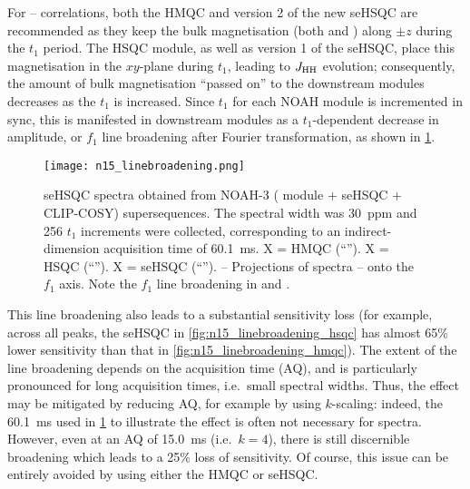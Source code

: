 For \nitrogen{}--\proton{} correlations, both the HMQC and version 2 of the new seHSQC are recommended as they keep the bulk magnetisation (both  and ) along $\pm z$ during the $t_1$ period.
The HSQC module, as well as version 1 of the seHSQC, place this magnetisation in the $xy$-plane during $t_1$, leading to $\jhh$ evolution; consequently, the amount of bulk magnetisation ``passed on'' to the downstream modules decreases as the \nitrogen{} $t_1$ is increased.
Since $t_1$ for each NOAH module is incremented in sync, this is manifested in downstream modules as a $t_1$-dependent decrease in amplitude, or $f_1$ line broadening after Fourier transformation, as shown in \cref{fig:n15_linebroadening}.

\begin{figure}
    \centering
    \texttt{[image: n15\_linebroadening.png]}
    {\label{fig:n15_linebroadening_hmqc}}
    {\label{fig:n15_linebroadening_hsqc}}
    {\label{fig:n15_linebroadening_spv2}}
    {\label{fig:n15_linebroadening_hmqc_f2proj}}
    {\label{fig:n15_linebroadening_hsqc_f2proj}}
    {\label{fig:n15_linebroadening_spv2_f2proj}}
    \caption{
        \carbon{} seHSQC spectra obtained from NOAH-3  (\nitrogen{} module + \carbon{} seHSQC + CLIP-COSY) supersequences.
        The \nitrogen{} spectral width was \SI{30}{ppm} and 256 $t_1$ increments were collected, corresponding to an indirect-dimension \nitrogen{} acquisition time of \SI{60.1}{\ms}.
        \textbf{} X = HMQC (``\noahM{}'').
        \textbf{} X = HSQC (``\noahS{}'').
        \textbf{} X = seHSQC (``\noahSpn{}'').
        \textbf{}--\textbf{} Projections of spectra \textbf{}--\textbf{} onto the $f_1$ axis.
        Note the $f_1$ line broadening in  and .
        \grami{}
    }
    \label{fig:n15_linebroadening}
\end{figure}

This line broadening also leads to a substantial sensitivity loss (for example, across all peaks, the \carbon{} seHSQC in \cref{fig:n15_linebroadening_hsqc} has almost 65\% lower sensitivity than that in \cref{fig:n15_linebroadening_hmqc}).
The extent of the line broadening depends on the acquisition time (AQ), and is particularly pronounced for long acquisition times, i.e.\ small \nitrogen{} spectral widths.
Thus, the effect may be mitigated by reducing AQ, for example by using $k$-scaling: indeed, the \SI{60.1}{\ms} used in \cref{fig:n15_linebroadening} to illustrate the effect is often not necessary for \nitrogen{} spectra.
However, even at an AQ of \SI{15.0}{\ms} (i.e.\ $k = 4$), there is still discernible broadening which leads to a 25\% loss of sensitivity.
Of course, this issue can be entirely avoided by using either the HMQC or seHSQC.

